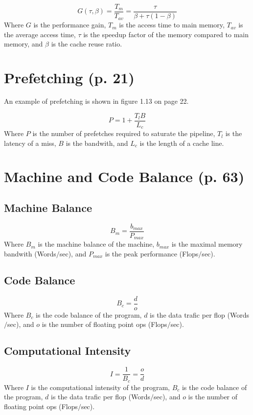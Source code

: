 \documentclass{article}
\begin{document}
		\begin{equation}
			G(\tau, \beta)=\frac{T_m}{T_{av}}=\frac{\tau}{\beta+\tau(1-\beta)}
		\end{equation}
		Where $G$ is the performance gain, $T_m$ is the access time to main memory, $T_{av}$ is the average access time, $\tau$ is the speedup factor of the memory compared to main memory, and $\beta$ is the cache reuse ratio.
	
	\section{Prefetching (p. 21)}
		An example of prefetching is shown in figure 1.13 on page 22.
	
		\begin{equation}
			P=1+\frac{T_l B}{L_c}
		\end{equation}
		Where $P$ is the number of prefetches required to saturate the pipeline, $T_l$ is the latency of a miss, $B$ is the bandwith, and $L_c$ is the length of a cache line.
	
	\section{Machine and Code Balance (p. 63)}
		\subsection{Machine Balance}
			\begin{equation}
				B_m=\frac{b_{max}}{P_{max}}
			\end{equation}
			Where $B_m$ is the machine balance of the machine, $b_{max}$ is the maximal memory bandwith (Words$/$sec), and $P_{max}$ is the peak performance (Flops$/$sec).

		\subsection{Code Balance}
			\begin{equation}
				B_c=\frac{d}{o}
			\end{equation}
			Where $B_c$ is the code balance of the program, $d$ is the data trafic per flop (Words$/$sec), and $o$ is the number of floating point ops (Flops$/$sec).
		
		\subsection{Computational Intensity}
			\begin{equation}
				I=\frac{1}{B_c}=\frac{o}{d}
			\end{equation}
			Where $I$ is the computational intensity of the program, $B_c$ is the code balance of the program, $d$ is the data trafic per flop (Words$/$sec), and $o$ is the number of floating point ops (Flops$/$sec).
		
\end{document}

